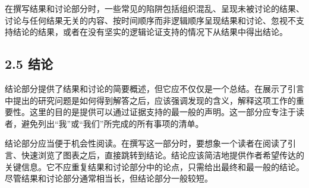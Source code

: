 在撰写结果和讨论部分时，一些常见的陷阱包括组织混乱、呈现未被讨论的结果、讨论与任何结果无关的内容、按时间顺序而非逻辑顺序呈现结果和讨论、忽视不支持结论的结果，或者在没有坚实的逻辑论证支持的情况下从结果中得出结论。

\subsection*{2.5 结论}
结论部分提供了结果和讨论的简要概述，但它应不仅仅是一个总结。在展示了引言中提出的研究问题是如何得到解答之后，应该强调发现的含义，解释这项工作的重要性。这里的目的是提供可以通过证据支持的最一般的声明。这一部分应专注于读者，避免列出“我”或“我们”所完成的所有事项的清单。

结论部分应当便于机会性阅读。在撰写这一部分时，要想象一个读者在阅读了引言、快速浏览了图表之后，直接跳转到结论。结论应该简洁地提供作者希望传达的关键信息。它不应重复结果和讨论部分中的论点，只需给出最终和最一般的结论。尽管结果和讨论部分通常相当长，但结论部分一般较短。

